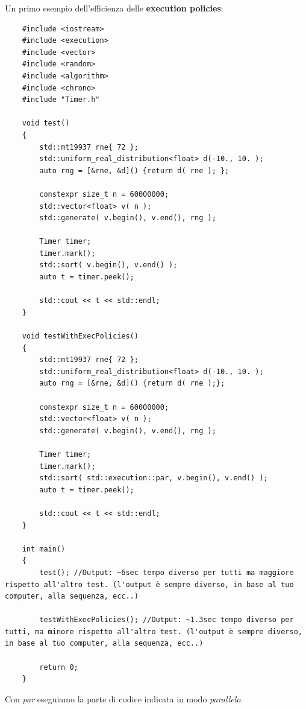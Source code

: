 \textsf{\small Un primo esempio dell'efficienza delle \textbf{execution policies}: } \\

\begin{lstlisting}
	#include <iostream>
	#include <execution>
	#include <vector>
	#include <random>
	#include <algorithm>
	#include <chrono>
	#include "Timer.h"

	void test()
	{
		std::mt19937 rne{ 72 };
		std::uniform_real_distribution<float> d(-10., 10. );
		auto rng = [&rne, &d]() {return d( rne ); };
		
		constexpr size_t n = 60000000;
		std::vector<float> v( n );
		std::generate( v.begin(), v.end(), rng ); 
		
		Timer timer;
		timer.mark();
		std::sort( v.begin(), v.end() );
		auto t = timer.peek();
		
		std::cout << t << std::endl;
	}
	
	void testWithExecPolicies()
	{
		std::mt19937 rne{ 72 };
		std::uniform_real_distribution<float> d(-10., 10. );
		auto rng = [&rne, &d]() {return d( rne );};
		
		constexpr size_t n = 60000000;
		std::vector<float> v( n );
		std::generate( v.begin(), v.end(), rng ); 
		
		Timer timer;
		timer.mark();
		std::sort( std::execution::par, v.begin(), v.end() );
		auto t = timer.peek();
		
		std::cout << t << std::endl;
	}
	
	int main()
	{
		test(); //Output: ~6sec tempo diverso per tutti ma maggiore rispetto all'altro test. (l'output è sempre diverso, in base al tuo computer, alla sequenza, ecc..)
		
		testWithExecPolicies(); //Output: ~1.3sec tempo diverso per tutti, ma minore rispetto all'altro test. (l'output è sempre diverso, in base al tuo computer, alla sequenza, ecc..)
		
		return 0;
	}
\end{lstlisting}


\textsf{\small Con \emph{par} eseguiamo la parte di codice indicata in modo \emph{parallelo}.} \\

